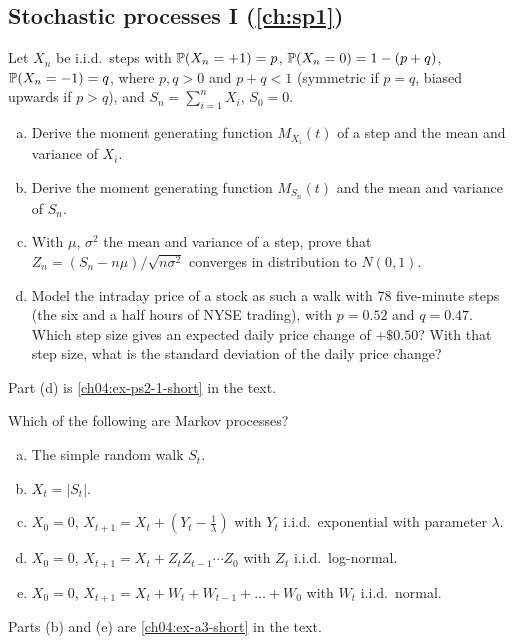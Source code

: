 \begin{paracol}{2}
\section{Stochastic processes I (\cref{ch:sp1})}\label{exam:sp1}

\begin{exercise}\label{ch04:ex-ps2-1}
Let $X_n$ be i.i.d.\ steps with $\mathbb{P}(X_n=+1)=p$, $\mathbb{P}(X_n=0)=1-(p+q)$, $\mathbb{P}(X_n=-1)=q$, where $p,q>0$ and $p+q<1$
(symmetric if $p=q$, biased upwards if $p>q$), and $S_n=\sum_{i=1}^nX_i$, $S_0=0$.
\begin{enumerate}[(a)]
  \item Derive the moment generating function $M_{X_i}(t)$ of a step and the mean and variance of $X_i$.
  \item Derive the moment generating function $M_{S_n}(t)$ and the mean and variance of $S_n$.
  \item With $\mu$, $\sigma^2$ the mean and variance of a step, prove that $Z_n=(S_n-n\mu)/\sqrt{n\sigma^2}$ converges in
      distribution to $N(0,1)$.
  \item Model the intraday price of a stock as such a walk with 78 five-minute steps (the six and a half hours of NYSE
      trading), with $p=0.52$ and $q=0.47$. Which step size gives an expected daily price change of $+\$0.50$? With that
      step size, what is the standard deviation of the daily price change?
\end{enumerate}
Part (d) is \cref{ch04:ex-ps2-1-short} in the text.
\end{exercise}

\begin{exercise}\label{ch04:ex-a3}
Which of the following are Markov processes?
\begin{enumerate}[(a)]
  \item The simple random walk $S_t$.
  \item $X_t=|S_t|$.
  \item $X_0=0$,
      $X_{t+1}=X_t+(Y_t-\tfrac1\lambda)$ with $Y_t$ i.i.d.\ exponential with parameter $\lambda$.
  \item $X_0=0$,
      $X_{t+1}=X_t+Z_tZ_{t-1}\cdots Z_0$ with $Z_t$ i.i.d.\ log-normal.
  \item $X_0=0$, $X_{t+1}=X_t+W_t+W_{t-1}+\dots+W_0$ with
      $W_t$ i.i.d.\ normal.
\end{enumerate}
Parts (b) and (e) are \cref{ch04:ex-a3-short} in the text.
\end{exercise}


\end{paracol}
